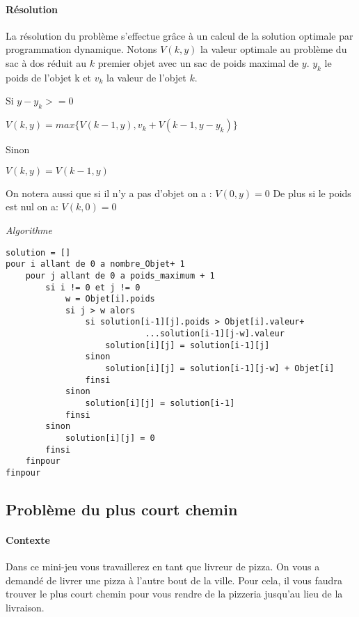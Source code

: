         \paragraph{Résolution}
            La résolution du problème s'effectue grâce à un calcul de la solution optimale
            par programmation dynamique. Notons $V(k,y)$ la valeur optimale au problème du sac à dos
            réduit au $k$ premier objet avec un sac de poids maximal de $y$.
            $y_{k}$ le poids de l'objet k et $v_{k}$ la valeur de l'objet $k$.

            Si $ y - y_{k} >= 0 $

                $V(k,y) = max\{ V(k-1,y)  ,v_{k} + V(k-1,y-y_{k}) \}$

            Sinon

                $V(k,y) = V(k-1,y)$

            On notera aussi que si il n'y a pas d'objet on a : $V(0,y) = 0$
            De plus si le poids est nul on a: $V(k,0) = 0$

	\emph{Algorithme}

\begin{lstlisting}
solution = []
pour i allant de 0 a nombre_Objet+ 1
    pour j allant de 0 a poids_maximum + 1
        si i != 0 et j != 0
            w = Objet[i].poids
            si j > w alors
                si solution[i-1][j].poids > Objet[i].valeur+
                            ...solution[i-1][j-w].valeur
                    solution[i][j] = solution[i-1][j]
                sinon
                    solution[i][j] = solution[i-1][j-w] + Objet[i]
                finsi
            sinon
                solution[i][j] = solution[i-1]
            finsi
        sinon
            solution[i][j] = 0
        finsi
    finpour
finpour
\end{lstlisting}


\subsection{Problème du plus court chemin}

        \paragraph{Contexte}
	    Dans ce mini-jeu vous travaillerez en tant que livreur de pizza. On vous a demandé de 
	    livrer une pizza à l'autre bout de la ville. Pour cela, il vous faudra trouver le plus court chemin
	    pour vous rendre de la pizzeria jusqu'au lieu de la livraison.
